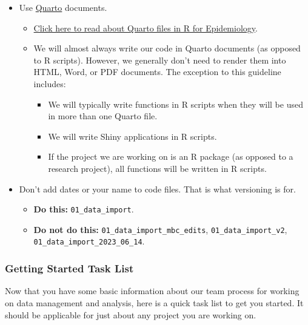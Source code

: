 \documentclass[
  letterpaper,
  DIV=11,
  numbers=noendperiod]{scrreprt}
\providecommand{\tightlist}{%
  \setlength{\itemsep}{0pt}\setlength{\parskip}{0pt}}\usepackage{longtable,booktabs,array}
\begin{document}
\begin{itemize}
\tightlist
\item
  Use \href{https://quarto.org/}{Quarto} documents.

  \begin{itemize}
  \tightlist
  \item
    \href{https://www.r4epi.com/quarto-files}{Click here to read about
    Quarto files in R for Epidemiology}.
  \item
    We will almost always write our code in Quarto documents (as opposed
    to R scripts). However, we generally don't need to render them into
    HTML, Word, or PDF documents. The exception to this guideline
    includes:

    \begin{itemize}
    \tightlist
    \item
      We will typically write functions in R scripts when they will be
      used in more than one Quarto file.
    \item
      We will write Shiny applications in R scripts.
    \item
      If the project we are working on is an R package (as opposed to a
      research project), all functions will be written in R scripts.
    \end{itemize}
  \end{itemize}
\item
  Don't add dates or your name to code files. That is what versioning is
  for.

  \begin{itemize}
  \tightlist
  \item
    \textbf{Do this:} \texttt{01\_data\_import}.
  \item
    \textbf{Do not do this:} \texttt{01\_data\_import\_mbc\_edits},
    \texttt{01\_data\_import\_v2},
    \texttt{01\_data\_import\_2023\_06\_14}.
  \end{itemize}
\end{itemize}

\subsubsection{Getting Started Task
List}\label{getting-started-task-list}

Now that you have some basic information about our team process for
working on data management and analysis, here is a quick task list to
get you started. It should be applicable for just about any project you
are working on.
\end{document}
